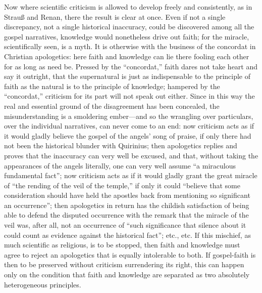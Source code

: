 \documentclass[12pt]{book}
\newcommand{\opage}[1]{\marginnote{\footnotesize\textit{[#1]}}}
\begin{document}
Now where scientific criticism is allowed to develop freely and consistently, as in Strauß and Renan, there the result is clear at once. Even if not a single discrepancy, not a single historical inaccuracy, could be discovered among all the gospel narratives, knowledge would nonetheless drive out faith; for the miracle, scientifically seen, is a myth. It is otherwise with the business of the concordat in Christian apologetics: here faith and knowledge can lie there fooling each other for as long as need be. Pressed by the ``concordat,'' faith dares not take heart and say it outright, that the supernatural is just as indispensable to the principle of faith as the natural is to the principle of knowledge; hampered by the ``concordat,'' criticism for its part will not speak out either. Since in this way the real and essential ground of the disagreement has been concealed, the misunderstanding is a smoldering ember---and so the wrangling over particulars, over the individual narratives, can never come to an end: now criticism acts as if it would gladly believe the gospel of the angels' song of praise, if only there had not been the historical blunder with Quirinius; then apologetics replies and proves that the inaccuracy can very well be excused, and that, without taking the appearances of the angels literally, one can very well assume ``a miraculous fundamental fact''; now criticism acts as if it would gladly grant the great miracle of ``the rending of the veil of the temple,'' if only it could ``believe that some consideration should have held the apostles back from mentioning so significant
\opage{56}\setcounter{footnote}{0}%
an occurrence''; then apologetics in return has the childish satisfaction of being able to defend the disputed occurrence with the remark that the miracle of the veil was, after all, not an occurrence of ``such significance that silence about it could count as evidence against the historical fact''; etc., etc. If this mischief, as much scientific as religious, is to be stopped, then faith and knowledge must agree to reject an apologetics that is equally intolerable to both. If gospel-faith is then to be preserved without criticism surrendering its right, this can happen only on the condition that faith and knowledge are separated as two absolutely heterogeneous principles.
\end{document}
